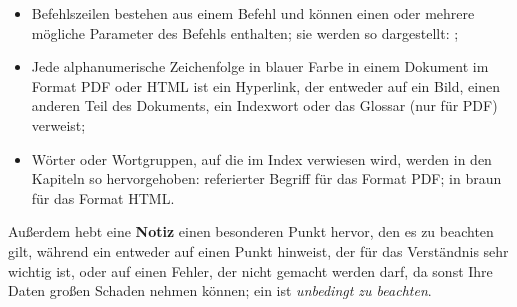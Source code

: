 {\begin{itemize}
		\newline
		\hspace*{1.5cm} und ;	
	\item Befehlszeilen bestehen aus einem Befehl und können einen oder mehrere mögliche Parameter des Befehls enthalten; sie werden so dargestellt:%
		\newline
		\hspace*{1.5cm}	;
	\item Jede alphanumerische Zeichenfolge in blauer Farbe in einem Dokument im Format \gls{PDF} oder \gls{HTML} ist ein Hyperlink, der entweder auf ein Bild, einen anderen Teil des Dokuments, ein Indexwort oder das Glossar (nur für \gls{PDF}) verweist;%
	\item Wörter oder Wortgruppen, auf die im Index verwiesen wird, werden in den Kapiteln so hervorgehoben:%
		\newline
		\hspace*{1.5cm}	\textsf{referierter Begriff} für das Format \gls{PDF}; %
		\newline 
		\hspace*{1.5cm} in braun für das Format \gls{HTML}.%
\end{itemize}

Außerdem hebt eine \textbf{Notiz} einen besonderen Punkt hervor, den es zu beachten gilt, während ein \textcolor{red}{} entweder auf einen Punkt hinweist, der für das Verständnis sehr wichtig ist, oder auf einen Fehler, der nicht gemacht werden darf, da sonst Ihre Daten großen Schaden nehmen können; ein \textcolor{red}{} ist \emph{unbedingt zu beachten}.

}
